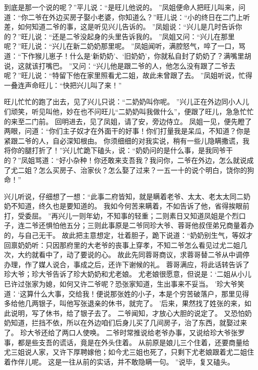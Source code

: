 到底是那一个说的呢？”平儿说：“是旺儿他说的。
”凤姐便命人把旺儿叫来，问道：“你二爷在外边买房子娶小老婆，你知道么？”旺儿说：“小的终日在二门上听差，如何知道二爷的事，这是听见兴儿告诉的。
”凤姐说：“兴儿是几时告诉你的？”旺儿说：“还是二爷没起身的头里告诉我的。
”凤姐又问：“兴儿在那里呢？”旺儿说：“兴儿在新二奶奶那里呢。
”凤姐闻听，满腔怒气，啐了一口，骂道：“下作猴儿崽子！什么是‘新奶奶’、‘旧奶奶’，你就私自封了奶奶了？满嘴里胡说，这就该打嘴巴。
”又问：“兴儿他是跟二爷的人，他怎么没有跟了二爷去呢？”旺儿说：“特留下他在家里照看尤二姐，故此未曾跟了去。
”凤姐听说，忙得一叠连声命旺儿：“快把兴儿叫了来！”\par
旺儿忙忙的跑了出去，见了兴儿只说：“二奶奶叫你呢。
”兴儿正在外边同小人儿们顽笑，听见叫他，妙在也不问旺儿“二奶奶叫我做什么”，便跟了旺儿，急急忙忙的来至二门前。
回明进去，见了凤姐，请了安，旁边侍立。
凤姐一见，便先瞪了两眼，问道：“你们主子奴才在外面干的好事！你们打量我是呆瓜，不知道？你是紧跟二爷的人，自必深知根由。
你须细细的对我实说，稍有一些儿隐瞒撒谎，我将你的腿打折了！”兴儿忙跪下磕头，说：“奶奶问的是什么事，是我同爷干的？”凤姐骂道：“好小杂种！你还敢来支吾我？我问你，二爷在外边，怎么就说成了尤二姐？怎么买房子、治家伙？怎么娶了过来？一五一十的说个明白，饶你的狗命！”\par
兴儿听说，仔细想了一想：“此事二府皆知，就是瞒着老爷、太太、老太太同二奶奶不知道，终久也是要知道的。
我如今何苦来瞒着，不如告诉了他，省得挨眼前打，受委屈。
”再兴儿一则年幼，不知事的轻重；二则素日又知道凤姐是个烈口子，连二爷还惧怕他五分；三则此事原是二爷同珍大爷、蓉哥他叔侄弟兄商量着办的，与自己无干。
故此把主意想定，壮着胆子，跪下说道：“奶奶别生气，等奴才回禀奶奶听：只因那府里的大老爷的丧事上穿孝，不知二爷怎么看见过尤二姐几次，大约就看中了，动了要说的心。
故此先同蓉哥商议，求蓉哥替二爷从中调停办理，作了媒人说合，事成之后，还许下谢候的礼。
蓉哥满应，将此话转告诉了珍大爷；珍大爷告诉了珍大奶奶和尤老娘。
尤老娘很愿意，但说是：‘二姐从小儿已许过张家为媳，如何又许二爷呢？恐张家知道，生出事来不妥当。
’珍大爷笑道：‘这算什么大事，交给我！便说那张姓的小子，本是个穷苦破落户，那里见得多给他几两银子，叫他写张退亲的休书，就完了。
’后来，果然找了姓张的来，如此说明，写了休书，给了银子去了。
二爷闻知，才放心大胆的说定了。
又恐怕奶奶知道，拦挡不依，所以在外边咱们后身儿买了几间房子，治了东西，就娶过来了。
珍大爷还给了两口人使唤。
二爷时常推说给老爷办事，又说给珍大爷张罗事，都是些支吾的谎话，竟是在外头住着。
从前原是娘儿三个住着，还要商量给尤三姐说人家，又许下厚聘嫁他；如今尤三姐也死了，只剩下尤老娘跟着尤二姐住着作伴儿呢。
这是一往从前的实话，并不敢隐瞒一句。
”说毕，复又磕头。
